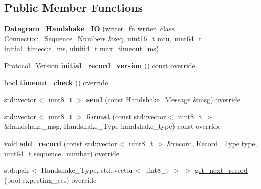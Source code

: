 \subsection*{Public Member Functions}
\begin{DoxyCompactItemize}
\item 
\mbox{\label{class_botan_1_1_t_l_s_1_1_datagram___handshake___i_o_ad9587248830410d8a42bf2ea77734e15}} 
{\bfseries Datagram\+\_\+\+Handshake\+\_\+\+IO} (writer\+\_\+fn writer, class \mbox{\hyperlink{class_botan_1_1_t_l_s_1_1_connection___sequence___numbers}{Connection\+\_\+\+Sequence\+\_\+\+Numbers}} \&seq, uint16\+\_\+t mtu, uint64\+\_\+t initial\+\_\+timeout\+\_\+ms, uint64\+\_\+t max\+\_\+timeout\+\_\+ms)
\item 
\mbox{\label{class_botan_1_1_t_l_s_1_1_datagram___handshake___i_o_abdc5905e64cf0673073e76f5df4909bf}} 
Protocol\+\_\+\+Version {\bfseries initial\+\_\+record\+\_\+version} () const override
\item 
\mbox{\label{class_botan_1_1_t_l_s_1_1_datagram___handshake___i_o_a579f1deb18de22bb514c7f7179ec1bf5}} 
bool {\bfseries timeout\+\_\+check} () override
\item 
\mbox{\label{class_botan_1_1_t_l_s_1_1_datagram___handshake___i_o_ad5019c95e958eb1988e0cb53edb7a5a5}} 
std\+::vector$<$ uint8\+\_\+t $>$ {\bfseries send} (const Handshake\+\_\+\+Message \&msg) override
\item 
\mbox{\label{class_botan_1_1_t_l_s_1_1_datagram___handshake___i_o_a8ff32130d67486bcb0a8f7af6de921a0}} 
std\+::vector$<$ uint8\+\_\+t $>$ {\bfseries format} (const std\+::vector$<$ uint8\+\_\+t $>$ \&handshake\+\_\+msg, Handshake\+\_\+\+Type handshake\+\_\+type) const override
\item 
\mbox{\label{class_botan_1_1_t_l_s_1_1_datagram___handshake___i_o_a62f8e113186fe7e01313bfe8d6b95e73}} 
void {\bfseries add\+\_\+record} (const std\+::vector$<$ uint8\+\_\+t $>$ \&record, Record\+\_\+\+Type type, uint64\+\_\+t sequence\+\_\+number) override
\item 
std\+::pair$<$ Handshake\+\_\+\+Type, std\+::vector$<$ uint8\+\_\+t $>$ $>$ \mbox{\hyperlink{class_botan_1_1_t_l_s_1_1_datagram___handshake___i_o_a70dbb457e3ba6ae8d43522c4e6db3c3b}{get\+\_\+next\+\_\+record}} (bool expecting\+\_\+ccs) override
\end{DoxyCompactItemize}


